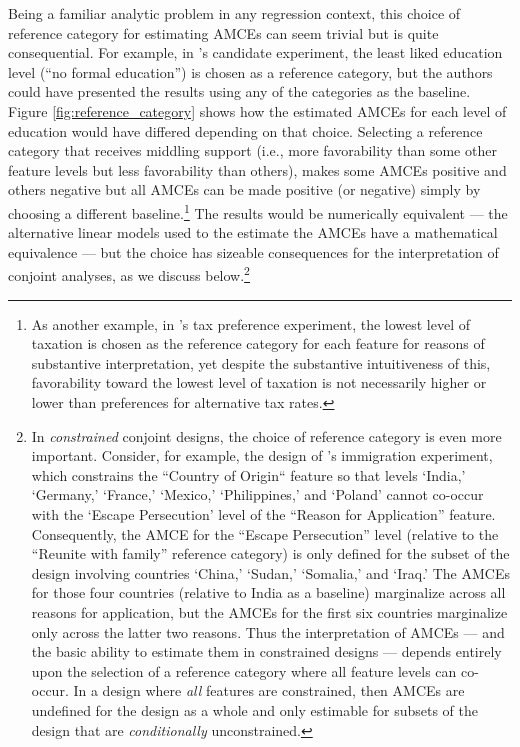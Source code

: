 \documentclass[a4paper,12pt]{article}\usepackage[]{graphicx}\usepackage[]{color}
\begin{document}
Being a familiar analytic problem in any regression context, this choice of reference category for estimating AMCEs can seem trivial but is quite consequential. For example, in \citeauthor{HainmuellerHopkinsYamamoto2014}'s candidate experiment, the least liked education level (``no formal education'') is chosen as a reference category, but the authors could have presented the results using any of the categories as the baseline. Figure \ref{fig:reference_category} shows how the estimated AMCEs for each level of education would have differed depending on that choice. Selecting a reference category that receives middling support (i.e., more favorability than some other feature levels but less favorability than others), makes some AMCEs positive and others negative but all AMCEs can be made positive (or negative) simply by choosing a different baseline.\footnote{As another example, in \citeauthor{BallardRosaMartinScheve2016}'s tax preference experiment, the lowest level of taxation is chosen as the reference category for each feature for reasons of substantive interpretation, yet despite the substantive intuitiveness of this, favorability toward the lowest level of taxation is not necessarily higher or lower than preferences for alternative tax rates.} The results would be numerically equivalent --- the alternative linear models used to the estimate the AMCEs have a mathematical equivalence --- but the choice has sizeable consequences for the interpretation of conjoint analyses, as we discuss below.\footnote{In \textit{constrained} conjoint designs, the choice of reference category is even more important. Consider, for example, the design of \citeauthor{HainmuellerHopkinsYamamoto2014}'s immigration experiment, which constrains the ``Country of Origin`` feature so that levels `India,' `Germany,' `France,' `Mexico,' `Philippines,' and `Poland' cannot co-occur with the `Escape Persecution' level of the ``Reason for Application'' feature. Consequently, the AMCE for the ``Escape Persecution'' level (relative to the  ``Reunite with family'' reference category) is only defined for the subset of the design involving countries `China,' `Sudan,' `Somalia,' and `Iraq.' The AMCEs for those four countries (relative to India as a baseline) marginalize across all reasons for application, but the AMCEs for the first six countries marginalize only across the latter two reasons. Thus the interpretation of AMCEs --- and the basic ability to estimate them in constrained designs --- depends entirely upon the selection of a reference category where all feature levels can co-occur. In a design where \textit{all} features are constrained, then AMCEs are undefined for the design as a whole and only estimable for subsets of the design that are \textit{conditionally} unconstrained.}
\end{document}
